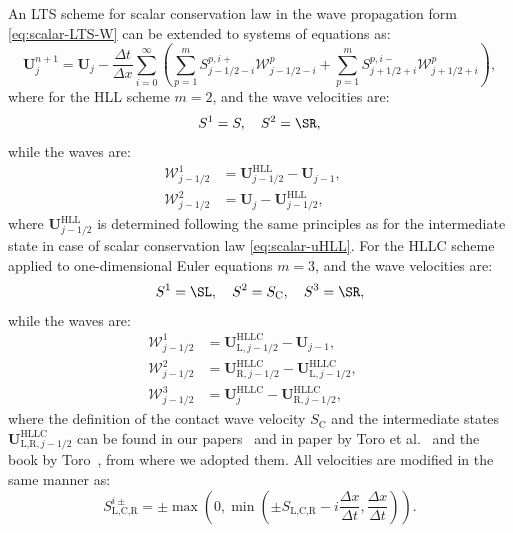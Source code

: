 An LTS scheme for scalar conservation law in the wave propagation form \eqref{eq:scalar-LTS-W} can be extended to systems of equations as:
\begin{equation} \label{eq:system-LTS-W}
\mathbf{U}_j^{n+1} = \mathbf{U}_j - 
\frac{\Delta t}{\Delta x} \sum\limits_{i=0}^{\infty} \left(
\sum\limits_{p=1}^{m} S_{j-1/2-i}^{p,i+} \mathcal{W}_{j-1/2-i}^p +
\sum\limits_{p=1}^{m} S_{j+1/2+i}^{p,i-} \mathcal{W}_{j+1/2+i}^p 
\right),
\end{equation}
where for the HLL scheme $ m=2 $, and the wave velocities are:
\begin{equation}
S^1 = S, \quad S^2 = \SR,
\end{equation}
while the waves are:
\begin{subequations}
\begin{align}
\mathcal{W}_{j-1/2}^1 & = \mathbf{U}_{j-1/2}^\text{HLL} - \mathbf{U}_{j-1}, \quad \\
\mathcal{W}_{j-1/2}^2 & = \mathbf{U}_{j} - \mathbf{U}_{j-1/2}^\text{HLL},
\end{align}
\end{subequations}
where $ \mathbf{U}_{j-1/2}^\text{HLL} $ is determined following the same principles as for the intermediate state in case of scalar conservation law \eqref{eq:scalar-uHLL}. For the HLLC scheme applied to one-dimensional Euler equations $ m=3 $, and the wave velocities are:
\begin{equation}
S^1 = \SL, \quad S^2 = S_\text{C}, \quad S^3 = \SR,
\end{equation}
while the waves are:
\begin{subequations}
\begin{align}
\mathcal{W}_{j-1/2}^1 & = \mathbf{U}_{\text{L},j-1/2}^\text{HLLC} - \mathbf{U}_{j-1}, \quad \\
\mathcal{W}_{j-1/2}^2 & = \mathbf{U}_{\text{R},j-1/2}^\text{HLLC} - \mathbf{U}_{\text{L},j-1/2}^\text{HLLC}, \quad \\
\mathcal{W}_{j-1/2}^3 & = \mathbf{U}_{j}^\text{HLLC} - \mathbf{U}_{\text{R},j-1/2}^\text{HLLC},
\end{align}
\end{subequations}
where the definition of the contact wave velocity $ S_\text{C} $ and the intermediate states $ \mathbf{U}_{\text{L,R},j-1/2}^\text{HLLC} $ can be found in our papers~\cite{cp2,jp2} and in paper by Toro et al.~\cite{tor94} and the book by Toro~\cite{tor09}, from where we adopted them. All velocities are modified in the same manner as:
\begin{equation} \label{eq:system-LTS-W-S}
S_\text{L,C,R}^{i\pm} = \pm \max \left( 0, \min \left( \pm S_\text{L,C,R} - i \frac{\Delta x}{\Delta t}, \frac{\Delta x}{\Delta t} \right) \right).
\end{equation}

